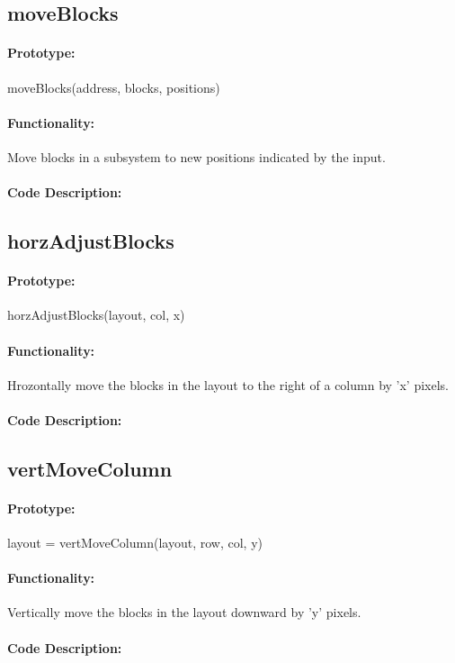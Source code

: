 \documentclass[12pt,letterpaper]{report}
\begin{document}
\subsection{moveBlocks}
\paragraph{Prototype:} moveBlocks(address, blocks, positions)
\paragraph{Functionality:} Move blocks in a subsystem to new positions indicated by the input.
\paragraph{Code Description:}

\subsection{horzAdjustBlocks}
\paragraph{Prototype:} horzAdjustBlocks(layout, col, x)
\paragraph{Functionality:} Hrozontally move the blocks in the layout to the right of a column by 'x' pixels.
\paragraph{Code Description:}

\subsection{vertMoveColumn}
\paragraph{Prototype:} layout = vertMoveColumn(layout, row, col, y)
\paragraph{Functionality:} Vertically move the blocks in the layout downward by 'y' pixels.
\paragraph{Code Description:}
\end{document}
